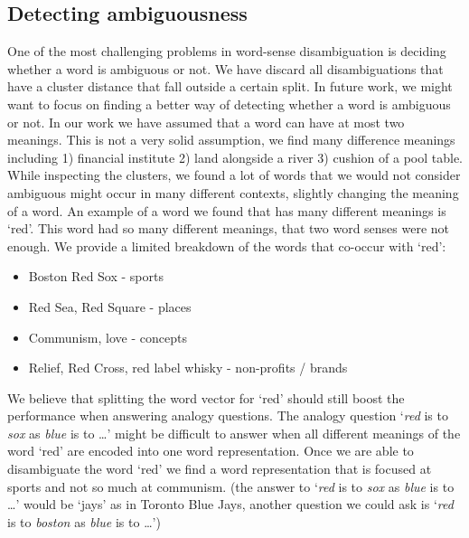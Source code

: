 \documentclass[11pt]{article}
\begin{document}
\subsection{Detecting ambiguousness}
One of the most challenging problems in word-sense disambiguation is deciding whether a word is ambiguous or not. We have discard all disambiguations that have a cluster distance that fall outside a certain split. In future work, we might want to focus on finding a better way of detecting whether a word is ambiguous or not. 
In our work we have assumed that a word can have at most two meanings. This is not a very solid assumption, we find many difference meanings including 1) financial institute 2) land alongside a river 3) cushion of a pool table. While inspecting the clusters, we found a lot of words that we would not consider ambiguous might occur in many different contexts, slightly changing the meaning of a word. An example of a word we found that has many different meanings is `red'. This word had so many different meanings, that two word senses were not enough. We provide a limited breakdown of the words that co-occur with `red':
\begin{itemize}
\item Boston Red Sox - sports
\item Red Sea, Red Square - places
\item Communism, love - concepts
\item Relief, Red Cross, red label whisky - non-profits / brands
\end{itemize} 

We believe that splitting the word vector for `red' should still boost the performance when answering analogy questions. The analogy question `\textit{red} is to \textit{sox} as \textit{blue} is to \dots' might be difficult to answer when all different meanings of the word `red' are encoded into one word representation. Once we are able to disambiguate the word `red' we find a word representation that is focused at sports and not so much at communism. (the answer to `\textit{red} is to \textit{sox} as \textit{blue} is to \dots' would be `jays' as in Toronto Blue Jays, another question we could ask is `\textit{red} is to \textit{boston} as \textit{blue} is to \dots')
\end{document}
